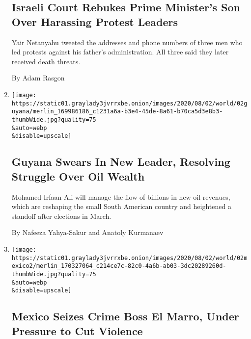\begin{enumerate}
  \hypertarget{israeli-court-rebukes-prime-ministers-son-over-harassing-protest-leaders}{%
  \subsection{Israeli Court Rebukes Prime Minister's Son Over Harassing
  Protest
  Leaders}\label{israeli-court-rebukes-prime-ministers-son-over-harassing-protest-leaders}}

  Yair Netanyahu tweeted the addresses and phone numbers of three men
  who led protests against his father's administration. All three said
  they later received death threats.

  By Adam Rasgon
\item
  \href{/2020/08/02/world/americas/guyana-president-ali-oil.html}{}

  \texttt{[image: https://static01.graylady3jvrrxbe.onion/images/2020/08/02/world/02guyana/merlin\_169986186\_c1231a6a-b3e4-45de-8a61-b70ca5d3e8b3-thumbWide.jpg?quality=75\\\&auto=webp\\\&disable=upscale]}

  \hypertarget{guyana-swears-in-new-leader-resolving-struggle-over-oil-wealth}{%
  \subsection{Guyana Swears In New Leader, Resolving Struggle Over Oil
  Wealth}\label{guyana-swears-in-new-leader-resolving-struggle-over-oil-wealth}}

  Mohamed Irfaan Ali will manage the flow of billions in new oil
  revenues, which are reshaping the small South American country and
  heightened a standoff after elections in March.

  By Nafeeza Yahya-Sakur and Anatoly Kurmanaev
\item
  \href{/2020/08/02/world/americas/mexico-el-marro-capture.html}{}

  \texttt{[image: https://static01.graylady3jvrrxbe.onion/images/2020/08/02/world/02mexico2/merlin\_170327064\_c214ce7c-82c0-4a6b-ab03-3dc20289260d-thumbWide.jpg?quality=75\\\&auto=webp\\\&disable=upscale]}

  \hypertarget{mexico-seizes-crime-boss-el-marro-under-pressure-to-cut-violence}{%
  \subsection{Mexico Seizes Crime Boss El Marro, Under Pressure to Cut
  Violence}\label{mexico-seizes-crime-boss-el-marro-under-pressure-to-cut-violence}}


\end{enumerate}
